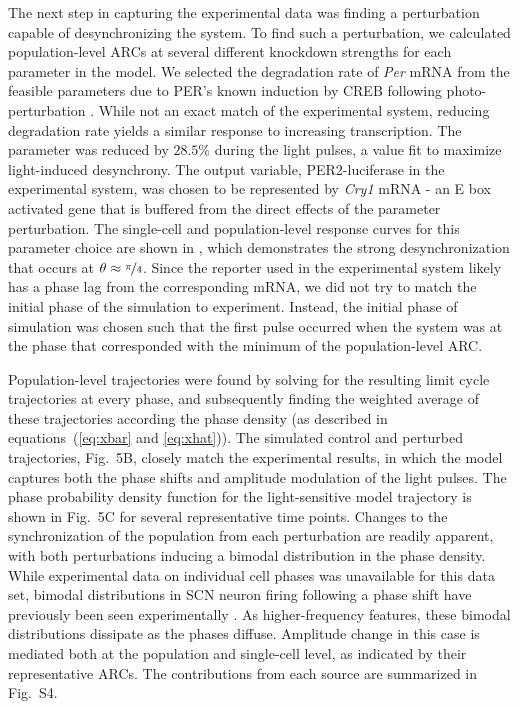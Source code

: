 The next step in capturing the experimental data was finding a perturbation capable of desynchronizing the system.
To find such a perturbation, we calculated population-level ARCs at several different knockdown strengths for each parameter in the model.
We selected the degradation rate of {\itshape Per} mRNA from the feasible parameters due to PER's known induction by CREB following photo-perturbation \cite{Tischkau2003}.
While not an exact match of the experimental system, reducing degradation rate yields a similar response to increasing transcription.
The parameter was reduced by $28.5\%$ during the light pulses, a value fit to maximize light-induced desynchrony.
The output variable, PER2-luciferase in the experimental system, was chosen to be represented by {\itshape Cry1} mRNA - an E box activated gene that is buffered from the direct effects of the parameter perturbation.
The single-cell and population-level response curves for this parameter choice are shown in , which demonstrates the strong desynchronization that occurs at $\theta\approx\nicefrac{\pi}{4}$.
Since the reporter used in the experimental system likely has a phase lag from the corresponding mRNA, we did not try to match the initial phase of the simulation to experiment.
Instead, the initial phase of simulation was chosen such that the first pulse occurred when the system was at the phase that corresponded with the minimum of the population-level ARC.

Population-level trajectories were found by solving for the resulting limit cycle trajectories at every phase, and subsequently finding the weighted average of these trajectories according the phase density (as described in equations~(\ref{eq:xbar} and \ref{eq:xhat})).
The simulated control and perturbed trajectories, Fig.~5B, closely match the experimental results, in which the model captures both the phase shifts and amplitude modulation of the light pulses.
The phase probability density function for the light-sensitive model trajectory is shown in Fig.~5C for several representative time points.
Changes to the synchronization of the population from each perturbation are readily apparent, with both perturbations inducing a bimodal distribution in the phase density.
While experimental data on individual cell phases was unavailable for this data set, bimodal distributions in SCN neuron firing following a phase shift have previously been seen experimentally \cite{Rohling2011}.
As higher-frequency features, these bimodal distributions dissipate as the phases diffuse.
Amplitude change in this case is mediated both at the population and single-cell level, as indicated by their representative ARCs. The contributions from each source are summarized in Fig.~S4.

